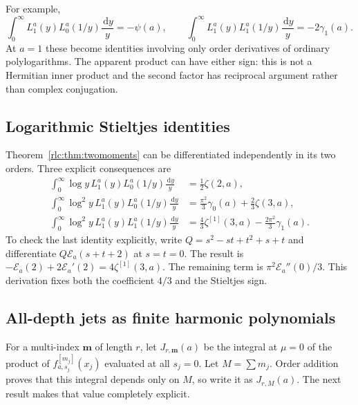 \documentclass[11pt,a4paper]{article}
\numberwithin{equation}{section}
\theoremstyle{definition}\newtheorem{definition}[theorem]{Definition}
\theoremstyle{remark}\newtheorem{remark}[theorem]{Remark}
\newcommand{\dd}{\,\mathrm d}
\newcommand{\E}{\mathcal E}
\begin{document}
For example,
\[
 \int_0^\infty L_1^a(y)L_0^a(1/y)\frac{\dd y}{y}
 =-\psi(a),\qquad
 \int_0^\infty L_1^a(y)L_1^a(1/y)\frac{\dd y}{y}
 =-2\gamma_1(a).
\]
At $a=1$ these become identities involving only order derivatives
of ordinary polylogarithms. The apparent product can have either sign:
this is not a Hermitian inner product and the second factor has
reciprocal argument rather than complex conjugation.

\subsection{Logarithmic Stieltjes identities}
Theorem~\ref{rlc:thm:twomoments} can be differentiated independently in
its two orders. Three explicit consequences are
\begin{align}
 \int_0^\infty\log y\,L_1^a(y)L_0^a(1/y)\frac{\dd y}{y}
 &=\frac12\zeta(2,a),\label{rlc:eq:jetlog1}\\
 \int_0^\infty\log^2 y\,L_1^a(y)L_0^a(1/y)\frac{\dd y}{y}
 &=\frac{\pi^2}{3}\gamma_0(a)+\frac23\zeta(3,a),
 \label{rlc:eq:jetlog2}\\
 \int_0^\infty\log^2 y\,L_1^a(y)L_1^a(1/y)\frac{\dd y}{y}
 &=\frac43\zeta^{[1]}(3,a)-\frac{2\pi^2}{3}\gamma_1(a).
 \label{rlc:eq:jetlogmixed}
\end{align}
To check the last identity explicitly, write
$Q=s^2-st+t^2+s+t$ and differentiate
$Q\E_a(s+t+2)$ at $s=t=0$. The result is
$-\E_a(2)+2\E_a'(2)=4\zeta^{[1]}(3,a)$.
The remaining term is $\pi^2\E_a''(0)/3$.
This derivation fixes both the coefficient $4/3$ and the Stieltjes sign.

\subsection{All-depth jets as finite harmonic polynomials}
For a multi-index $\boldsymbol m$ of length $r$, let
$J_{r,\boldsymbol m}(a)$ be the integral at $\mu=0$ of the product of
$f_{a,s_j}^{[m_j]}(x_j)$ evaluated at all $s_j=0$. Let
$M=\sum m_j$. Order addition proves that this integral depends only on
$M$, so write it as $J_{r,M}(a)$.
The next result makes that value completely explicit.
\end{document}

